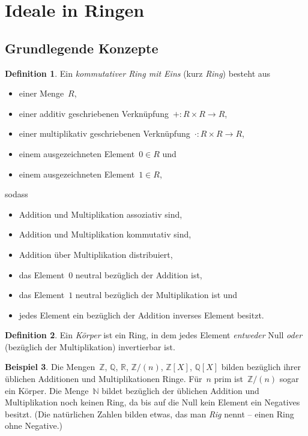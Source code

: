 \documentclass[a4paper,ngerman,12pt]{scrartcl}
\theoremstyle{definition}
\newtheorem{defn}{Definition}[section]
\newtheorem{bsp}[defn]{Beispiel}
\theoremstyle{plain}
\theoremstyle{remark}
\newcommand{\ZZ}{\mathbb{Z}}
\newcommand{\QQ}{\mathbb{Q}}
\newcommand{\RR}{\mathbb{R}}
\newcommand{\NN}{\mathbb{N}}
\renewcommand{\_}{\mathpunct{.}\,}
\newcommand{\?}{\,{:}\,}
\begin{document}
\section{Ideale in Ringen}
\label{appendix:ideale}

\subsection{Grundlegende Konzepte}

\begin{defn}Ein \emph{kommutativer Ring mit Eins} (kurz \emph{Ring}) besteht aus
\begin{itemize}
\item einer Menge~$R$,
\item einer additiv geschriebenen Verknüpfung~${+} : R \times R \to R$,
\item einer multiplikativ geschriebenen Verknüpfung~${\cdot} : R \times R \to R$,
\item einem ausgezeichneten Element~$0 \in R$ und
\item einem ausgezeichneten Element~$1 \in R$,
\end{itemize}
sodass
\begin{itemize}
\item Addition und Multiplikation assoziativ sind,
\item Addition und Multiplikation kommutativ sind,
\item Addition über Multiplikation distribuiert,
\item das Element~$0$ neutral bezüglich der Addition ist,
\item das Element~$1$ neutral bezüglich der Multiplikation ist und
\item jedes Element ein bezüglich der Addition inverses Element besitzt.
\end{itemize}
\end{defn}

\begin{defn}Ein \emph{Körper} ist ein Ring, in dem jedes Element
\emph{entweder} Null \emph{oder} (bezüglich der Multiplikation) invertierbar
ist.\end{defn}

\begin{bsp}Die Mengen~$\ZZ$, $\QQ$, $\RR$, $\ZZ/(n)$, $\ZZ[X]$, $\QQ[X]$ bilden
bezüglich ihrer üblichen Additionen und Multiplikationen Ringe. Für~$n$ prim
ist~$\ZZ/(n)$ sogar ein Körper. Die Menge~$\NN$ bildet bezüglich der üblichen
Addition und Multiplikation noch keinen Ring, da bis auf die Null kein Element
ein Negatives besitzt. (Die natürlichen Zahlen bilden etwas, das man \emph{Rig}
nennt -- einen Ring ohne Negative.)\end{bsp}
\end{document}
